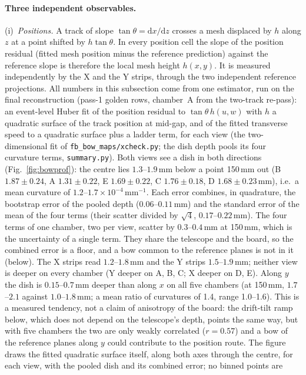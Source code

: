 \paragraph{Three independent observables.}
(i)~\emph{Positions.} A track of slope $\tan\theta = \mathrm{d}x/\mathrm{d}z$ crosses a mesh displaced by $h$ along $z$
at a point shifted by $h\tan\theta$. In every position cell the slope of the position residual (fitted mesh position
minus the reference prediction) against the reference slope is therefore the local mesh height $h(x,y)$. It is measured independently
by the X and the Y strips, through the two independent reference projections. All numbers in this subsection come from one
estimator, run on the final reconstruction (pass-1 golden rows, chamber~A from the two-track re-pass): an event-level Huber fit of
the position residual to $\tan\theta\,h(u,w)$ with $h$ a quadratic surface of the track position at mid-gap, and of the fitted
transverse speed to a quadratic surface plus a ladder term, for each view (the two-dimensional fit of
\texttt{fb\_bow\_maps/xcheck.py}; the dish depth pools its four curvature terms, \texttt{summary.py}). Both views see a dish in both directions
(Fig.~\ref{fig:bowprof}): the centre lies $1.3$--$1.9$\,mm below a point 150\,mm out
(B $1.87\pm0.24$, A $1.31\pm0.22$, E $1.69\pm0.22$, C $1.76\pm0.18$, D $1.68\pm0.23$\,mm), i.e.\ a mean curvature of
$1.2$--$1.7\times10^{-4}$\,mm$^{-1}$. Each error combines, in quadrature, the bootstrap error of the pooled depth ($0.06$--$0.11$\,mm)
and the standard error of the mean of the four terms (their scatter divided by $\sqrt4$, $0.17$--$0.22$\,mm). The four terms of one chamber, two
per view, scatter by $0.3$--$0.4$\,mm at 150\,mm, which is the uncertainty of a single term. They share the telescope and the board, so the
combined error is a floor, and a bow common to the reference planes is not in it (below).
The X strips read $1.2$--$1.8$\,mm and the Y strips $1.5$--$1.9$\,mm; neither view is deeper on every chamber
(Y deeper on A, B, C; X deeper on D, E). Along $y$ the dish is $0.15$--$0.7$\,mm deeper than along $x$ on all five chambers
(at 150\,mm, $1.7$--$2.1$ against $1.0$--$1.8$\,mm; a mean ratio of curvatures of 1.4, range 1.0--1.6). This is a measured tendency, not a claim of
anisotropy of the board: the drift-tilt ramp below, which does not depend on the telescope's depth, points the same way, but with five chambers
the two are only weakly correlated ($r=0.57$) and a bow of the reference planes along $y$ could contribute to the position route. The figure draws the
fitted quadratic surface itself, along both axes through the centre, for each view, with the pooled dish and its combined error; no binned points are
